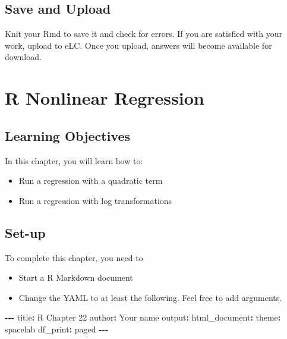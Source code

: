 \documentclass[
]{book}
\makeatletter
\newenvironment{Shaded}{\begin{snugshade}}{\end{snugshade}}
\newcommand{\NormalTok}[1]{#1}
\newcommand{\SpecialCharTok}[1]{\textcolor[rgb]{0.43,0.43,0.43}{\textbf{#1}}}
\newcommand{\StringTok}[1]{\textcolor[rgb]{0.5,0.5,0.5}{#1}}
\providecommand{\tightlist}{%
  \setlength{\itemsep}{0pt}\setlength{\parskip}{0pt}}
\newenvironment{kframe}{%
\medskip{}
\setlength{\fboxsep}{.8em}
 \def\at@end@of@kframe{}%
 \ifinner\ifhmode%
  \def\at@end@of@kframe{\end{minipage}}%
  \begin{minipage}{\columnwidth}%
 \fi\fi%
 \def\FrameCommand##1{\hskip\@totalleftmargin \hskip-\fboxsep
 \colorbox{shadecolor}{##1}\hskip-\fboxsep
     \hskip-\linewidth \hskip-\@totalleftmargin \hskip\columnwidth}%
 \MakeFramed {\advance\hsize-\width
   \@totalleftmargin\z@ \linewidth\hsize
   \@setminipage}}%
 {\par\unskip\endMakeFramed%
 \at@end@of@kframe}
\renewenvironment{Shaded}{\begin{kframe}}{\end{kframe}}
\makeatother
\begin{document}
\hypertarget{save-and-upload-5}{%
\section{Save and Upload}\label{save-and-upload-5}}

Knit your Rmd to save it and check for errors. If you are satisfied with your work, upload to eLC. Once you upload, answers will become available for download.

\hypertarget{r-nonlinear-regression}{%
\chapter{R Nonlinear Regression}\label{r-nonlinear-regression}}

\hypertarget{learning-objectives-5}{%
\section{Learning Objectives}\label{learning-objectives-5}}

In this chapter, you will learn how to:

\begin{itemize}
\tightlist
\item
  Run a regression with a quadratic term
\item
  Run a regression with log transformations
\end{itemize}

\hypertarget{set-up-5}{%
\section{Set-up}\label{set-up-5}}

To complete this chapter, you need to

\begin{itemize}
\tightlist
\item
  Start a R Markdown document
\item
  Change the YAML to at least the following. Feel free to add arguments.
\end{itemize}

\begin{Shaded}
\begin{Highlighting}[]
\SpecialCharTok{{-}{-}{-}}
\NormalTok{title}\SpecialCharTok{:} \StringTok{\textquotesingle{}R Chapter 22\textquotesingle{}}
\NormalTok{author}\SpecialCharTok{:} \StringTok{\textquotesingle{}Your name\textquotesingle{}}
\NormalTok{output}\SpecialCharTok{:} 
\NormalTok{  html\_document}\SpecialCharTok{:}
\NormalTok{    theme}\SpecialCharTok{:}\NormalTok{ spacelab}
\NormalTok{    df\_print}\SpecialCharTok{:}\NormalTok{ paged}
\SpecialCharTok{{-}{-}{-}}
\end{Highlighting}
\end{Shaded}
\end{document}
